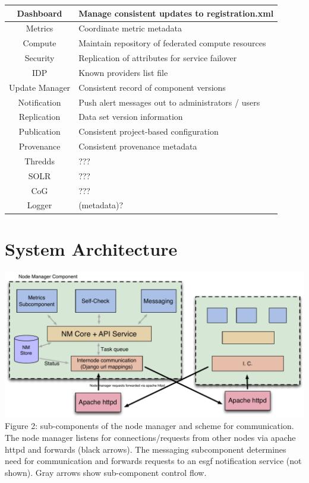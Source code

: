 \documentclass[oneside,12pt]{memoir}
\begin{document}
\begin{tabular}{|c|l|}
\hline
Dashboard &  Manage consistent updates to registration.xml \\
\hline
Metrics & Coordinate metric metadata \\
\hline
Compute & Maintain repository of federated compute resources \\
\hline
Security & Replication of attributes for service failover \\
\hline
 IDP & Known providers list file \\
\hline
Update Manager & Consistent record of component versions \\
\hline
Notification & Push alert messages out to administrators / users \\
\hline
Replication & Data set version information \\
\hline
Publication & Consistent project-based configuration \\
\hline
Provenance & Consistent provenance metadata \\
\hline
Thredds & ??? \\
\hline
SOLR & ??? \\
\hline
CoG & ??? \\
\hline
Logger & (metadata)? \\
\hline
\end{tabular}



\section{System Architecture}



\begin{center}
\includegraphics[width=\textwidth]{presentation/NM-design-v2.pdf}
Figure 2:  sub-components of the node manager and scheme for communication.  The node manager listens for connections/requests from other nodes via apache httpd and forwards (black arrows).  The messaging subcomponent determines need for communication and forwards requests to an esgf notification service (not shown).  Gray arrows show sub-component control flow.
\end{center}
\newpage
\end{document}

